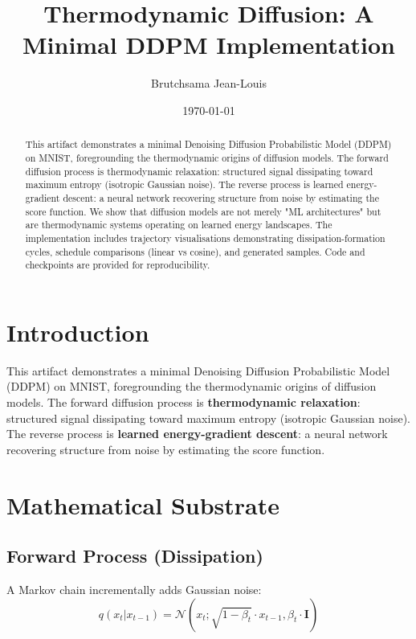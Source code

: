 \documentclass{article}
\title{Thermodynamic Diffusion: A Minimal DDPM Implementation}
\author{Brutchsama Jean-Louis}
\date{\today}
\begin{document}
\maketitle

\begin{abstract}
This artifact demonstrates a minimal Denoising Diffusion Probabilistic Model (DDPM) on MNIST, foregrounding the thermodynamic origins of diffusion models. The forward diffusion process is thermodynamic relaxation: structured signal dissipating toward maximum entropy (isotropic Gaussian noise). The reverse process is learned energy-gradient descent: a neural network recovering structure from noise by estimating the score function. We show that diffusion models are not merely "ML architectures" but are thermodynamic systems operating on learned energy landscapes. The implementation includes trajectory visualisations demonstrating dissipation-formation cycles, schedule comparisons (linear vs cosine), and generated samples. Code and checkpoints are provided for reproducibility.
\end{abstract}

\section{Introduction}

This artifact demonstrates a minimal Denoising Diffusion Probabilistic Model (DDPM) on MNIST, foregrounding the thermodynamic origins of diffusion models. The forward diffusion process is \textbf{thermodynamic relaxation}: structured signal dissipating toward maximum entropy (isotropic Gaussian noise). The reverse process is \textbf{learned energy-gradient descent}: a neural network recovering structure from noise by estimating the score function.

\section{Mathematical Substrate}

\subsection{Forward Process (Dissipation)}

A Markov chain incrementally adds Gaussian noise:
\begin{equation}
q(x_t | x_{t-1}) = \mathcal{N}(x_t; \sqrt{1 - \beta_t} \cdot x_{t-1}, \beta_t \cdot \mathbf{I})
\end{equation}
\end{document}
